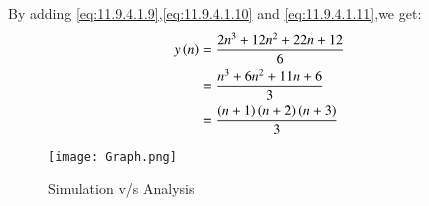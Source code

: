 \documentclass[journal,12pt,twocolumn]{IEEEtran}
\theoremstyle{remark}
\begin{document}
By adding \eqref{eq:11.9.4.1.9},\eqref{eq:11.9.4.1.10} and \eqref{eq:11.9.4.1.11},we get:
\begin{align}
    y\left(n\right)&=\frac{2n^3+12n^2+22n+12}{6}\label{eq;11.9.4.1.12}\\
    &=\frac{n^3+6n^2+11n+6}{3}\label{eq:11.9.4.1.13}\\
    &=\frac{\left(n+1\right)\left(n+2\right)\left(n+3\right)}{3}\label{eq:11.9.4.1.14}
\end{align}
\begin{figure}[h]
        \centering
\texttt{[image: Graph.png]}
    \caption{Simulation v/s Analysis}
    \label{fig:plot11.9.4.1}
\end{figure}
\end{document}
